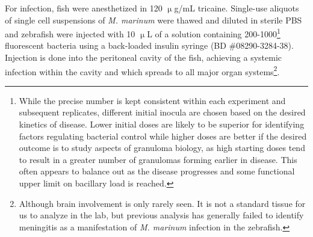 For infection, fish were anesthetized in 120 $\upmu$g/mL tricaine. Single\hyp{}use aliquots of single cell suspensions of \textit{M. marinum} were thawed and diluted in sterile PBS and zebrafish were injected with 10 $\upmu$L of a solution containing 200\hyp{}1000\footnote{While the precise number is kept consistent within each experiment and subsequent replicates, different initial inocula are chosen based on the desired kinetics of disease. Lower initial doses are likely to be superior for identifying factors regulating bacterial control while higher doses are better if the desired outcome is to study aspects of granuloma biology, as high starting doses tend to result in a greater number of granulomas forming earlier in disease. This often appears to balance out as the disease progresses and some functional upper limit on bacillary load is reached.} fluorescent bacteria using a back\hyp{}loaded insulin syringe (BD \#08290\hyp{}3284\hyp{}38). Injection is done into the peritoneal cavity of the fish, achieving a systemic infection within the cavity and which spreads to all major organ systems\footnote{Although brain involvement is only rarely seen. It is not a standard tissue for us to analyze in the lab, but previous analysis has generally failed to identify meningitis as a manifestation of \textit{M. marinum} infection in the zebrafish.}. 

